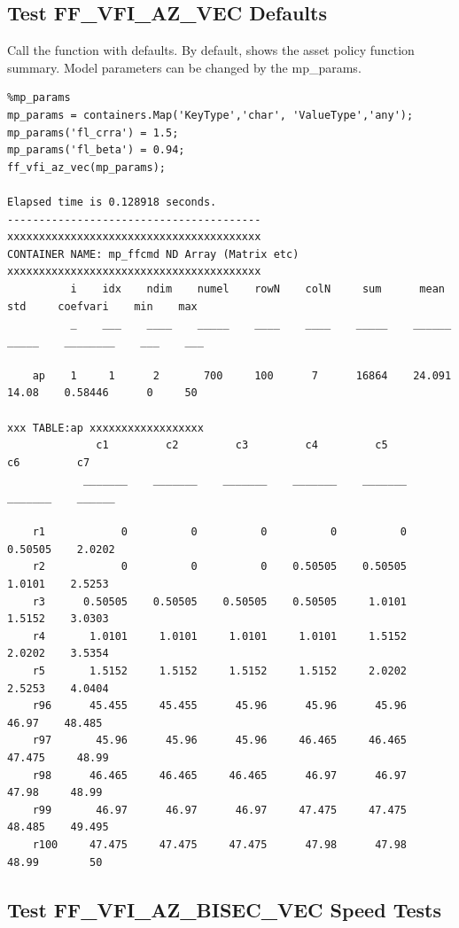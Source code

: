 \documentclass[
]{book}
\begin{document}
\hypertarget{test-ff_vfi_az_vec-defaults}{%
\subsection{Test FF\_VFI\_AZ\_VEC Defaults}\label{test-ff_vfi_az_vec-defaults}}

Call the function with defaults. By default, shows the asset policy
function summary. Model parameters can be changed by the mp\_params.

\begin{verbatim}
%mp_params
mp_params = containers.Map('KeyType','char', 'ValueType','any');
mp_params('fl_crra') = 1.5;
mp_params('fl_beta') = 0.94;
ff_vfi_az_vec(mp_params);

Elapsed time is 0.128918 seconds.
----------------------------------------
xxxxxxxxxxxxxxxxxxxxxxxxxxxxxxxxxxxxxxxx
CONTAINER NAME: mp_ffcmd ND Array (Matrix etc)
xxxxxxxxxxxxxxxxxxxxxxxxxxxxxxxxxxxxxxxx
          i    idx    ndim    numel    rowN    colN     sum      mean      std     coefvari    min    max
          _    ___    ____    _____    ____    ____    _____    ______    _____    ________    ___    ___

    ap    1     1      2       700     100      7      16864    24.091    14.08    0.58446      0     50 

xxx TABLE:ap xxxxxxxxxxxxxxxxxx
              c1         c2         c3         c4         c5         c6         c7  
            _______    _______    _______    _______    _______    _______    ______

    r1            0          0          0          0          0    0.50505    2.0202
    r2            0          0          0    0.50505    0.50505     1.0101    2.5253
    r3      0.50505    0.50505    0.50505    0.50505     1.0101     1.5152    3.0303
    r4       1.0101     1.0101     1.0101     1.0101     1.5152     2.0202    3.5354
    r5       1.5152     1.5152     1.5152     1.5152     2.0202     2.5253    4.0404
    r96      45.455     45.455      45.96      45.96      45.96      46.97    48.485
    r97       45.96      45.96      45.96     46.465     46.465     47.475     48.99
    r98      46.465     46.465     46.465      46.97      46.97      47.98     48.99
    r99       46.97      46.97      46.97     47.475     47.475     48.485    49.495
    r100     47.475     47.475     47.475      47.98      47.98      48.99        50
\end{verbatim}

\hypertarget{test-ff_vfi_az_bisec_vec-speed-tests}{%
\subsection{Test FF\_VFI\_AZ\_BISEC\_VEC Speed Tests}\label{test-ff_vfi_az_bisec_vec-speed-tests}}
\end{document}
